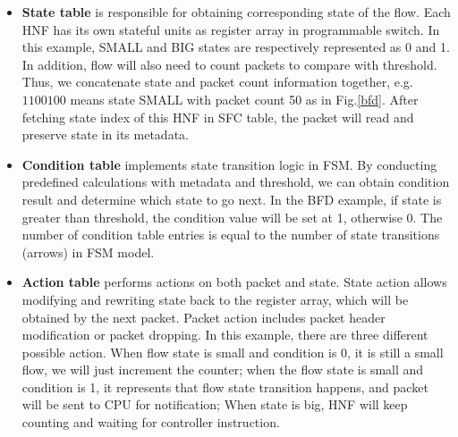 \documentclass[10pt, conference, letterpaper]{IEEEtran}
\begin{document}
\begin{itemize}
\item \textbf{State table} is responsible for obtaining corresponding state of the flow. Each HNF has its own stateful units as register array in programmable switch. In this example, SMALL and BIG states are respectively represented as 0 and 1. In addition, flow will also need to count packets to compare with threshold. Thus, we concatenate state and packet count information together, e.g. $1100100$ means state SMALL with packet count 50 as in Fig.\ref{bfd}. After fetching state index of this HNF in SFC table, the packet will read and preserve state in its metadata.
\end{itemize}

\begin{itemize}
\item \textbf{Condition table} implements state transition logic in FSM. By conducting predefined calculations with metadata and threshold, we can obtain condition result and determine which state to go next. In the BFD example, if state is greater than threshold, the condition value will be set at 1, otherwise 0. The number of condition table entries is equal to the number of state transitions (arrows) in FSM model.
\end{itemize}

\begin{itemize}
\item \textbf{Action table} performs actions on both packet and state. State action allows modifying and rewriting state back to the register array, which will be obtained by the next packet. Packet action includes packet header modification or packet dropping. 
In this example, there are three different possible action. When flow state is small and condition is 0, it is still a small flow, we will just increment the counter; when the flow state is small and condition is 1, it represents that flow state transition happens, and packet will be sent to CPU for notification; When state is big, HNF will keep counting and waiting for controller instruction.
\end{itemize} 
\end{document}
